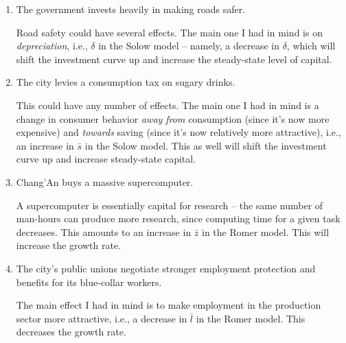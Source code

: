 \documentclass{article}
\newenvironment{solution}{\color{red}}{\color{black}}
\begin{document}
\begin{enumerate}
\item The government invests heavily in making roads safer.

\begin{solution}
Road safety could have several effects. The main one I had in mind is on \emph{depreciation}, i.e., $\delta$ in the Solow model -- namely, a decrease in $\delta$, which will shift the investment curve up and increase the steady-state level of capital.
\end{solution}

\item The city levies a consumption tax on sugary drinks.

\begin{solution}
This could have any number of effects. The main one I had in mind is a change in consumer behavior \emph{away from} consumption (since it's now more expensive) and \emph{towards} saving (since it's now relatively more attractive), i.e., an increase in $\bar{s}$ in the Solow model. This as well will shift the investment curve up and increase steady-state capital.
\end{solution}

\item Chang'An buys a massive supercomputer.

\begin{solution}
A supercomputer is essentially capital for research -- the same number of man-hours can produce more research, since computing time for a given task decreases. This amounts to an increase in $\bar{z}$ in the Romer model. This will increase the growth rate.
\end{solution}

\item The city's public unions negotiate stronger employment protection and benefits for its blue-collar workers.

\begin{solution}
The main effect I had in mind is to make employment in the production sector more attractive, i.e., a decrease in $\bar{l}$ in the Romer model. This decreases the growth rate.
\end{solution}
\end{enumerate}
\end{document}

